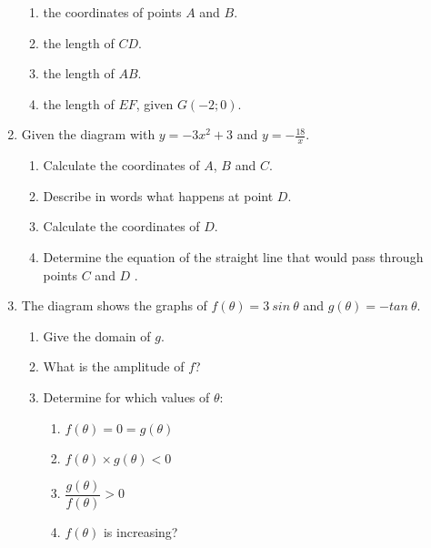 \begin{eocexercises}{}
\begin{enumerate}[itemsep=9pt, label=\textbf{\arabic*}. ]
\begin{enumerate}[noitemsep, label=\textbf{(\alph*)} ]
    \item the coordinates of points $A$ and $B$.
    \item the length of $CD$.
    \item the length of $AB$.
    \item the length of $EF$, given $G(-2;0)$.
  \end{enumerate}
\item Given the diagram with $y=-3x^2+3$ and $y=-\frac{18}{x}$.\\
    \begin{enumerate}[noitemsep, label=\textbf{(\alph*)} ]
    \item Calculate the coordinates of $A$, $B$ and $C$.
    \item Describe in words what happens at point $D$.
    \item Calculate the coordinates of $D$.
    \item Determine the equation of the straight line that would pass through points $C$ and $D$ .
  \end{enumerate}
\item The diagram shows the graphs of $f(\theta)=3~sin~\theta$ and $g(\theta)=-tan~\theta$.
    \begin{enumerate}[noitemsep, label=\textbf{(\alph*)} ]
    \item Give the domain of $g$.
    \item What is the amplitude of $f$?
    \item Determine for which values of $\theta$:
      \begin{enumerate}[noitemsep, label=\textbf{\roman*}. ]
	    \item $f(\theta)=0=g(\theta)$
	    \item $f(\theta)\times g(\theta)<0$
	    \item $\dfrac{g(\theta)}{f(\theta)}>0$
	    \item $f(\theta)$ is increasing?
  \end{enumerate}
  \end{enumerate}
  \end{enumerate}

\end{eocexercises}


